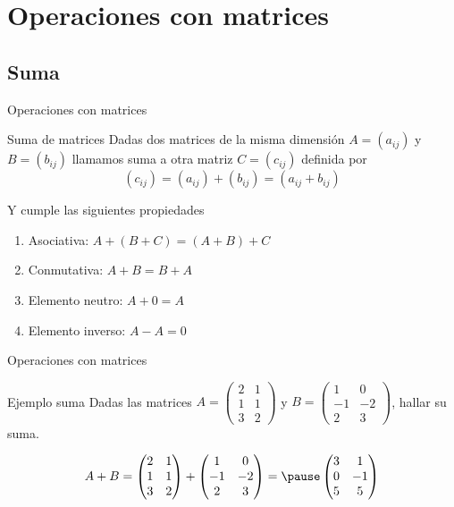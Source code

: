 \documentclass[9pt]{beamer}
\begin{document}
\section{Operaciones con matrices}

\subsection{Suma}

\begin{frame}{Operaciones con matrices}
\begin{alertblock}{Suma de matrices}
Dadas dos matrices de la misma dimensión $A=(a_{ij})$ y $B=(b_{ij})$ llamamos suma a otra matriz $C=(c_{ij})$ definida por 
$$(c_{ij})=(a_{ij})+(b_{ij})=(a_{ij}+b_{ij})$$
\end{alertblock}
\pause
Y cumple las siguientes propiedades

	\begin{enumerate}[<+-| alert@+>] 
		\item Asociativa: $A+(B+C)=(A+B)+C$
		\item Conmutativa: $A+B=B+A$
		\item Elemento neutro: $A+0=A$
		\item Elemento inverso: $A-A=0$
	\end{enumerate}
	
\end{frame}

\begin{frame}{Operaciones con matrices}
\begin{exampleblock}{Ejemplo suma}
Dadas las matrices $A=\begin{pmatrix}
	2 & 1 \\
	1 & 1 \\
	3 & 2
\end{pmatrix}$ y $ B=
     \begin{pmatrix}
	1 & 0 \\
	-1 & -2 \\
	2 & 3
\end{pmatrix}    $, hallar su suma.
\end{exampleblock}
\pause
\[ A+B=   \begin{pmatrix}
	2 & 1 \\
	1 & 1 \\
	3 & 2
\end{pmatrix} 
     +
     \begin{pmatrix}
	1 & 0 \\
	-1 & -2 \\
	2 & 3
\end{pmatrix}    = 
\pause
\begin{pmatrix}
	3 & 1 \\
	0 &-1 \\
	5 & 5
\end{pmatrix}    \]


\end{frame}
\end{document}
